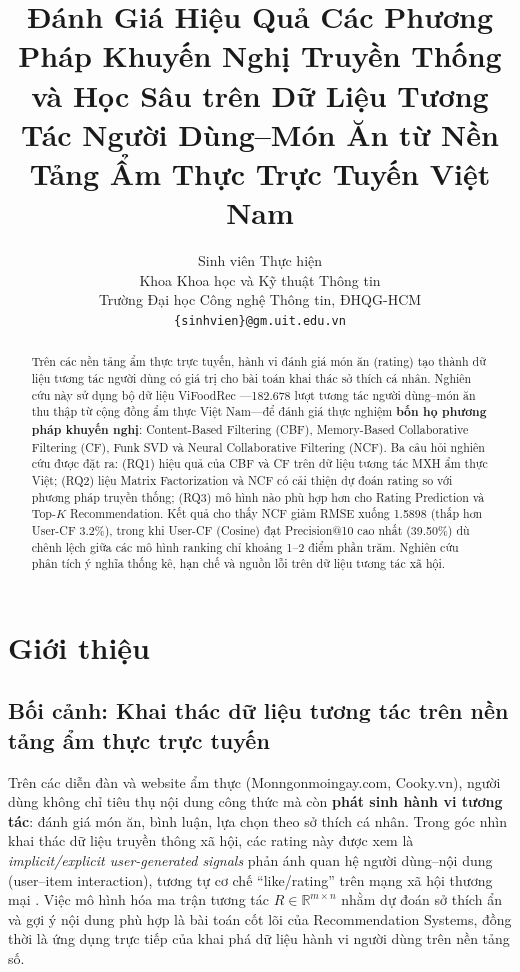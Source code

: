 \documentclass[11pt]{article}
\title{Đánh Giá Hiệu Quả Các Phương Pháp Khuyến Nghị Truyền Thống và Học Sâu trên Dữ Liệu Tương Tác Người Dùng--Món Ăn từ Nền Tảng Ẩm Thực Trực Tuyến Việt Nam}
\author{
  Sinh viên Thực hiện \\
  Khoa Khoa học và Kỹ thuật Thông tin \\
  Trường Đại học Công nghệ Thông tin, ĐHQG-HCM \\
  \texttt{\{sinhvien\}@gm.uit.edu.vn}
}
\date{}
\begin{document}
\maketitle

\begin{abstract}
Trên các nền tảng ẩm thực trực tuyến, hành vi đánh giá món ăn (rating) tạo thành dữ liệu tương tác người dùng có giá trị cho bài toán khai thác sở thích cá nhân. Nghiên cứu này sử dụng bộ dữ liệu ViFoodRec \cite{tran2024vifoodrec}---182.678 lượt tương tác người dùng--món ăn thu thập từ cộng đồng ẩm thực Việt Nam---để đánh giá thực nghiệm \textbf{bốn họ phương pháp khuyến nghị}: Content-Based Filtering (CBF), Memory-Based Collaborative Filtering (CF), Funk SVD và Neural Collaborative Filtering (NCF). Ba câu hỏi nghiên cứu được đặt ra: (RQ1) hiệu quả của CBF và CF trên dữ liệu tương tác MXH ẩm thực Việt; (RQ2) liệu Matrix Factorization và NCF có cải thiện dự đoán rating so với phương pháp truyền thống; (RQ3) mô hình nào phù hợp hơn cho Rating Prediction và Top-$K$ Recommendation. Kết quả cho thấy NCF giảm RMSE xuống 1.5898 (thấp hơn User-CF 3.2\%), trong khi User-CF (Cosine) đạt Precision@10 cao nhất (39.50\%) dù chênh lệch giữa các mô hình ranking chỉ khoảng 1--2 điểm phần trăm. Nghiên cứu phân tích ý nghĩa thống kê, hạn chế và nguồn lỗi trên dữ liệu tương tác xã hội.
\end{abstract}

\section{Giới thiệu}
\label{sec:intro}

\subsection{Bối cảnh: Khai thác dữ liệu tương tác trên nền tảng ẩm thực trực tuyến}
Trên các diễn đàn và website ẩm thực (Monngonmoingay.com, Cooky.vn), người dùng không chỉ tiêu thụ nội dung công thức mà còn \textbf{phát sinh hành vi tương tác}: đánh giá món ăn, bình luận, lựa chọn theo sở thích cá nhân. Trong góc nhìn khai thác dữ liệu truyền thông xã hội, các rating này được xem là \textit{implicit/explicit user-generated signals} phản ánh quan hệ người dùng--nội dung (user--item interaction), tương tự cơ chế ``like/rating'' trên mạng xã hội thương mại \cite{adomavicius2005toward}. Việc mô hình hóa ma trận tương tác $R \in \mathbb{R}^{m \times n}$ nhằm dự đoán sở thích ẩn và gợi ý nội dung phù hợp là bài toán cốt lõi của Recommendation Systems, đồng thời là ứng dụng trực tiếp của khai phá dữ liệu hành vi người dùng trên nền tảng số.
\end{document}

